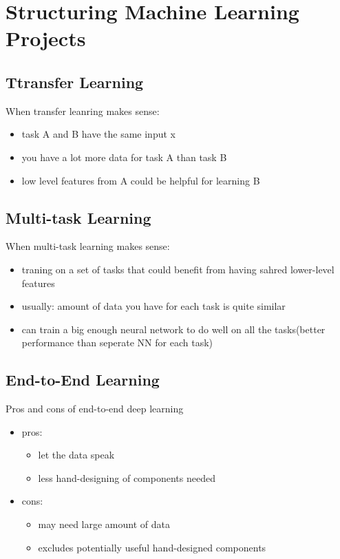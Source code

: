 \section{Structuring Machine Learning Projects}
\subsection{Ttransfer Learning}
When transfer leanring makes sense:
\begin{itemize}
\item task A and B have the same input x
\item you have a lot more data for task A than task B
\item low level features from A could be helpful for learning B
\end{itemize}

\subsection{Multi-task Learning}
When multi-task learning makes sense:
\begin{itemize}
\item traning on a set of tasks that could benefit from having sahred lower-level features
\item usually: amount of data you have for each task is quite similar
\item can train a big enough neural network to do well on all the tasks(better performance than seperate NN for each task)
\end{itemize}

\subsection{End-to-End Learning}
Pros and cons of end-to-end deep learning
\begin{itemize}
\item pros:
	\begin{itemize}
	\item let the data speak
	\item less hand-designing of components needed
	\end{itemize}
\item cons:
	\begin{itemize}
	\item may need large amount of data
	\item excludes potentially useful hand-designed components
	\end{itemize}
\end{itemize}

